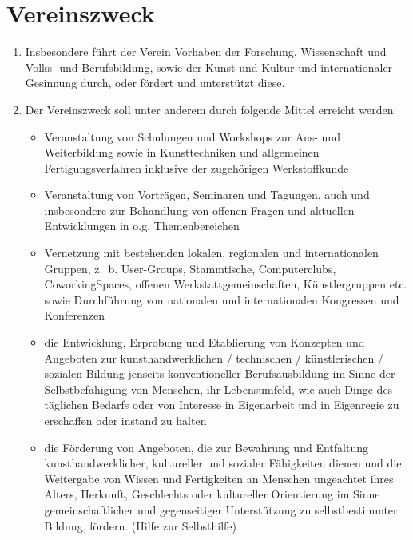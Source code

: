 \documentclass[a5paper, ngerman, 10pt]{scrreprt}
\begin{document}
\section{Vereinszweck}
\begin{enumerate}[(1)]
    \item Insbesondere führt der Verein Vorhaben der Forschung, Wissenschaft
        und Volks- und Berufsbildung, sowie der Kunst und Kultur und
        internationaler Gesinnung durch, oder fördert und unterstützt diese.
    \item Der Vereinszweck soll unter anderem durch folgende Mittel erreicht
        werden:
        \begin{itemize}
            \item Veranstaltung von Schulungen und Workshops zur Aus- und
                Weiterbildung sowie in Kunsttechniken und allgemeinen
                Fertigungsverfahren inklusive der zugehörigen
                Werkstoffkunde
            \item Veranstaltung von Vorträgen, Seminaren und Tagungen, auch und
                insbesondere zur Behandlung von offenen Fragen und aktuellen
                Entwicklungen in o.g. Themenbereichen
            \item Vernetzung mit bestehenden lokalen, regionalen und
                internationalen Gruppen, z.~b.  User-Groups, Stammtische,
                Computerclubs, CoworkingSpaces, offenen
                Werkstattgemeinschaften, Künstlergruppen etc. sowie
                Durchführung von nationalen und internationalen Kongressen und
                Konferenzen
            \item die Entwicklung, Erprobung und Etablierung von Konzepten und
                Angeboten zur kunsthandwerklichen / technischen /
                künstlerischen / sozialen Bildung jenseits konventioneller
                Berufsausbildung im Sinne der Selbstbefähigung von Menschen,
                ihr Lebensumfeld, wie auch Dinge des täglichen Bedarfs oder von
                Interesse in Eigenarbeit und in Eigenregie zu erschaffen oder
                instand zu halten
            \item die Förderung von Angeboten, die zur Bewahrung und Entfaltung
                kunsthandwerklicher, kultureller und sozialer Fähigkeiten
                dienen und die Weitergabe von Wissen und Fertigkeiten an
                Menschen ungeachtet ihres Alters, Herkunft, Geschlechts oder
                kultureller Orientierung im Sinne gemeinschaftlicher und
                gegenseitiger Unterstützung zu selbstbestimmter Bildung,
                fördern. (Hilfe zur Selbsthilfe)
        \end{itemize}
\end{enumerate}
\end{document}
